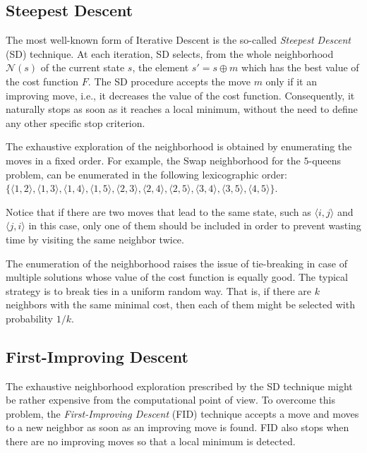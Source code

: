 \subsection{Steepest Descent}

The most well-known form of Iterative Descent is the so-called
\emph{Steepest Descent} (SD) technique. At each iteration, SD selects,
from the whole neighborhood $\mathcal{N}(s)$ of the current state
$s$, the element $s' = s \oplus m$ which has the best value of the
cost function $F$.  The SD procedure accepts the move $m$ only if it
an improving move, i.e., it decreases the value of the cost function. 
Consequently, it naturally stops as soon as it reaches a
local minimum, without the need to define any other specific stop criterion.

The exhaustive exploration of the neighborhood is obtained by
enumerating the moves in a fixed order.  For example, the
\textsf{Swap} neighborhood for the $5$-queens problem, can be
enumerated in the following lexicographic order: $\{\langle 1,2\rangle, \langle
1,3\rangle, \langle 1,4\rangle, \langle 1,5\rangle, \langle
2,3\rangle, \langle 2,4\rangle, \langle 2,5\rangle, \langle
3,4\rangle, \langle 3,5\rangle, \langle 4,5\rangle\}$.

Notice that if there are two moves that lead to the same state, such as $\langle i,j\rangle$ and $\langle j,i\rangle$ in this case, only one of them should be included in order to prevent wasting time by visiting the same neighbor twice.

The enumeration of the neighborhood raises the issue of tie-breaking
in case of multiple solutions whose value of the cost function is equally good. 
The typical strategy is
to break ties in a uniform random way. That is, if there are $k$
neighbors with the same minimal cost, then each of them might be selected with
probability $1/k$.

\subsection{First-Improving Descent}


The exhaustive neighborhood exploration prescribed by the SD technique might be
rather expensive from the computational point of view. To overcome
this problem, the \emph{First-Improving Descent} (FID) technique accepts a move and moves
to a new neighbor as soon as an improving move is found. FID also
stops when there are no improving moves so that a local minimum is
detected.

